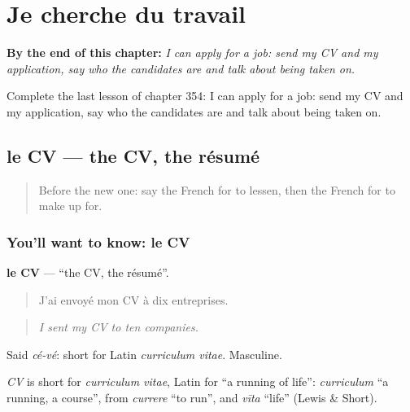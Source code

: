 
\chapter{Je cherche du travail}
\label{ch:fr-je-cherche-du-travail}

\begin{chapteropening}
\textbf{By the end of this chapter:} \emph{I can apply for a job: send my CV and my application, say who the candidates are and talk about being taken on.}

Complete the last lesson of chapter 354: I can apply for a job: send my CV and my application, say who the candidates are and talk about being taken on.
\end{chapteropening}

\section[le CV]{le CV — the CV, the résumé}

\label{lesson:FR-C354-cv}



\begin{quote}
Before the new one: say the French for to lessen, then the French for to make up for.
\end{quote}

\subsection*{You'll want to know: le CV}
\textbf{le CV} — \textquotedblleft{}the CV, the résumé\textquotedblright{}.

\begin{quote}
J'ai envoyé mon CV à dix entreprises.
\end{quote}

\begin{quote}
\emph{I sent my CV to ten companies.}
\end{quote}

Said \emph{cé-vé}: short for Latin \emph{curriculum vitae}. Masculine.

\begin{cousinweb}
\emph{CV} is short for \emph{curriculum vitae}, Latin for \textquotedblleft{}a running of life\textquotedblright{}: \emph{curriculum} \textquotedblleft{}a running, a course\textquotedblright{}, from \emph{currere} \textquotedblleft{}to run\textquotedblright{}, and \emph{vīta} \textquotedblleft{}life\textquotedblright{} (Lewis \& Short).
\end{cousinweb}

